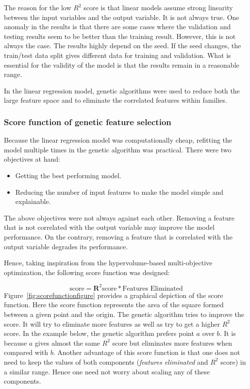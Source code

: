 \documentclass[11pt]{article}
\begin{document}
The reason for the low $R^2$ score is that linear models assume strong linearity between the input variables and the output variable.
It is not always true.
One anomaly in the results is that there are some cases where the validation and testing results seem to be better than the training result.
However, this is not always the case. 
The results highly depend on the seed.
If the seed changes, the train/test data split gives different data for training and validation.
What is essential for the validity of the model is that the results remain in a reasonable range.

In the linear regression model,  genetic algorithms were used to reduce both the large feature space and to eliminate the correlated features within families. 

\subsubsection{Score function of genetic feature selection}
\label{GenerationScoringFunction}
Because the linear regression model was computationally cheap, refitting the model multiple times in the genetic algorithm was practical.
There were two objectives at hand:
\begin{itemize}
\item Getting the best performing model.
\item Reducing the number of input features to make the model simple and explainable.
\end{itemize}
The above objectives were not always against each other.
Removing a feature that is not correlated with the output variable may improve the model performance. On the contrary, removing a feature that is correlated with the output variable degrades its performance.

Hence, taking inspiration from the hypervolume-based multi-objective optimization, the following score function was designed:

$$
\textrm{score} = \mathbf{R}^2 \textrm{score} * \textrm{Features Eliminated}
$$
Figure~\ref{fig:scorefunctionfigure} provides a graphical depiction of the score function.
Here the score function represents the area of the square formed between a given point and the origin.
The genetic algorithm tries to improve the score. It will try to eliminate more features as well as try to get a higher $R^2$ score.
In the example below, the genetic algorithm prefers point $a$ over $b$. It is because $a$ gives almost the same $R^2$ score but eliminates more features when compared with $b$.
Another advantage of this score function is that one does not need to keep the values of both components (\textit{features eliminated} and \textit{$R^2$} score) in a similar range.
Hence one need not worry about scaling any of these components.
\end{document}
